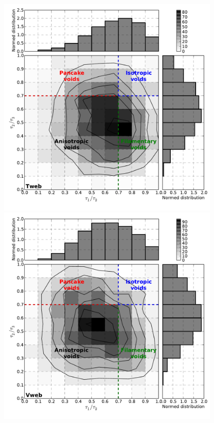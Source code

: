 \documentclass[usenatbib]{latex/mn2e}
\begin{document}
\begin{flushleft}
\begin{figure}
\begin{center}

  \includegraphics[trim = 7mm 9mm 1mm 0mm, clip, keepaspectratio=true,
  width=0.36\textheight]{./figures/voids_inertia_tensor_Tweb}
  \includegraphics[trim = 7mm 9mm 1mm 0mm, clip, keepaspectratio=true,
  width=0.36\textheight]{./figures/voids_inertia_tensor_Vweb}


\end{center}
\end{figure}
\end{flushleft}
\end{document}
